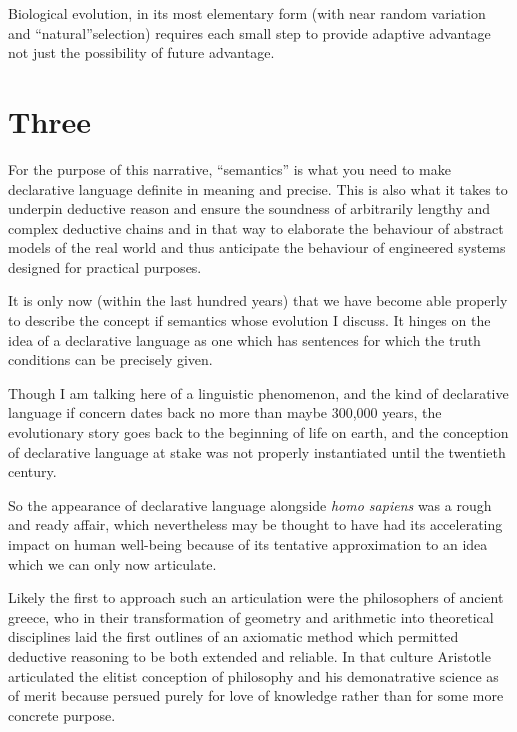 Biological evolution, in its most elementary form (with near random variation and ``natural''selection) requires each small step to provide adaptive advantage not just the possibility of future advantage.



\section{Three}

For the purpose of this narrative, ``semantics'' is what you need to make declarative language definite in meaning and precise.
This is also what it takes to underpin deductive reason and ensure the soundness of arbitrarily lengthy and complex deductive chains and in that way to elaborate the behaviour of abstract models of the real world and thus anticipate the behaviour of engineered systems designed for practical purposes.

It is only now (within the last hundred years) that 
we have become able properly to describe the concept if semantics whose evolution I discuss.
It hinges on the idea of a declarative language as one which has sentences for which the truth conditions can be precisely given.

Though I am talking here of a linguistic phenomenon, and the kind of declarative language if concern dates back no more than maybe 300,000 years, the evolutionary story goes back to the beginning of life on earth, and the conception of declarative language at stake was not properly instantiated until the twentieth century.

So the appearance of declarative language alongside \emph{homo sapiens} was a rough and ready affair, which nevertheless may be thought to have had its accelerating impact on human well-being because of its tentative approximation to an idea which we can only now articulate.

Likely the first to approach such an articulation were the philosophers of ancient greece, who in their transformation of geometry and arithmetic into theoretical disciplines laid the first outlines of an axiomatic method which permitted deductive reasoning to be both extended and reliable.
In that culture Aristotle articulated the elitist conception of philosophy and his demonatrative science as of merit because persued purely for love of knowledge rather than for some more concrete purpose.


